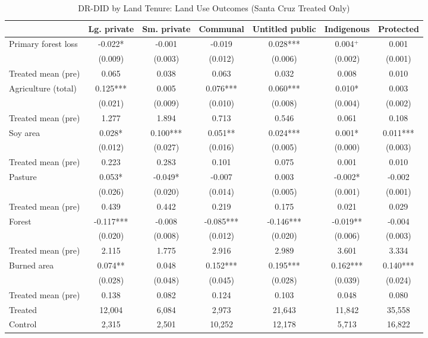 \begin{table}[htbp]
\centering
\small
\caption{DR-DID by Land Tenure: Land Use Outcomes (Santa Cruz Treated Only)}
\label{tab:did_drdid_landuse_bydept_sc}
\begin{tabular}{lcccccc}
\toprule
 & Lg. private & Sm. private & Communal & Untitled public & Indigenous & Protected \\
\midrule
Primary forest loss & -0.022* & -0.001 & -0.019 & 0.028*** & 0.004$^{+}$ & 0.001 \\
 & (0.009) & (0.003) & (0.012) & (0.006) & (0.002) & (0.001) \\
Treated mean (pre) & 0.065 & 0.038 & 0.063 & 0.032 & 0.008 & 0.010 \\
[0.5em]
Agriculture (total) & 0.125*** & 0.005 & 0.076*** & 0.060*** & 0.010* & 0.003 \\
 & (0.021) & (0.009) & (0.010) & (0.008) & (0.004) & (0.002) \\
Treated mean (pre) & 1.277 & 1.894 & 0.713 & 0.546 & 0.061 & 0.108 \\
[0.5em]
Soy area & 0.028* & 0.100*** & 0.051** & 0.024*** & 0.001* & 0.011*** \\
 & (0.012) & (0.027) & (0.016) & (0.005) & (0.000) & (0.003) \\
Treated mean (pre) & 0.223 & 0.283 & 0.101 & 0.075 & 0.001 & 0.010 \\
[0.5em]
Pasture & 0.053* & -0.049* & -0.007 & 0.003 & -0.002* & -0.002 \\
 & (0.026) & (0.020) & (0.014) & (0.005) & (0.001) & (0.001) \\
Treated mean (pre) & 0.439 & 0.442 & 0.219 & 0.175 & 0.021 & 0.029 \\
[0.5em]
Forest & -0.117*** & -0.008 & -0.085*** & -0.146*** & -0.019** & -0.004 \\
 & (0.020) & (0.008) & (0.012) & (0.020) & (0.006) & (0.003) \\
Treated mean (pre) & 2.115 & 1.775 & 2.916 & 2.989 & 3.601 & 3.334 \\
[0.5em]
Burned area & 0.074** & 0.048 & 0.152*** & 0.195*** & 0.162*** & 0.140*** \\
 & (0.028) & (0.048) & (0.045) & (0.028) & (0.039) & (0.024) \\
Treated mean (pre) & 0.138 & 0.082 & 0.124 & 0.103 & 0.048 & 0.080 \\
\midrule
Treated & 12,004 & 6,084 & 2,973 & 21,643 & 11,842 & 35,558 \\
Control & 2,315 & 2,501 & 10,252 & 12,178 & 5,713 & 16,822 \\

\end{tabular}
\end{table}
